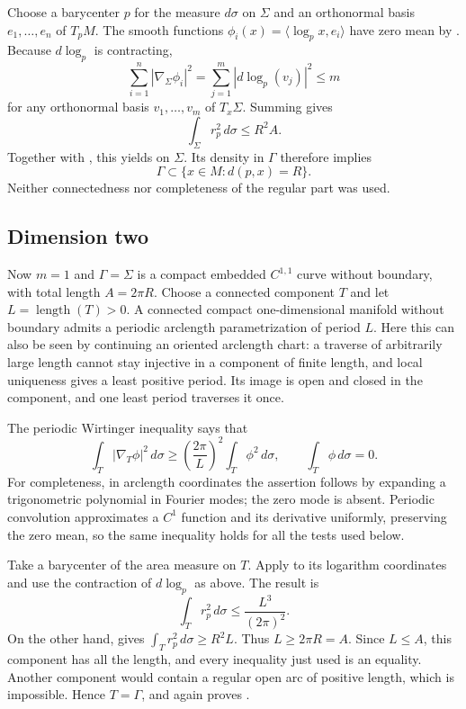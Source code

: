 Choose a barycenter $p$ for the measure $d\sigma$ on $\Sigma$ and an
orthonormal basis $e_1,\ldots,e_n$ of $T_pM$.
The smooth functions
$\phi_i(x)=\langle\log_p x,e_i\rangle$ have zero mean by
. Because $d\log_p$ is contracting,
\[
 \sum_{i=1}^n|\nabla_\Sigma\phi_i|^2
 =\sum_{j=1}^m|d\log_p(v_j)|^2\le m
\]
for any orthonormal basis $v_1,\ldots,v_m$ of $T_x\Sigma$.
Summing  gives
\begin{equation}\label{eq:upper-moment}
 \int_\Sigma r_p^2\,d\sigma\le R^2A.
\end{equation}
Together with , this yields
 on $\Sigma$. Its density in $\Gamma$ therefore
implies
\begin{equation}\label{eq:central-sphere}
 \Gamma\subset\{x\in M:d(p,x)=R\}.
\end{equation}
Neither connectedness nor completeness of the regular part was used.

\subsection{Dimension two}
Now $m=1$ and $\Gamma=\Sigma$ is a compact embedded $C^{1,1}$
curve without boundary, with total length $A=2\pi R$.
Choose a connected component $T$ and let $L=\operatorname{length}(T)>0$.
A connected compact one-dimensional manifold without boundary admits a
periodic arclength parametrization of period $L$. Here this can also be
seen by continuing an oriented arclength chart: a traverse of arbitrarily
large length cannot stay injective in a component of finite length, and
local uniqueness gives a least positive period. Its image is open and
closed in the component, and one least period traverses it once.

The periodic Wirtinger inequality says that
\begin{equation}\label{eq:wirtinger}
 \int_T |\nabla_T\phi|^2\,d\sigma
 \ge \left(\frac{2\pi}{L}\right)^2
       \int_T\phi^2\,d\sigma,
 \qquad \int_T\phi\,d\sigma=0.
\end{equation}
For completeness, in arclength coordinates the assertion follows by
expanding a trigonometric polynomial in Fourier modes; the zero mode is
absent. Periodic convolution approximates a $C^1$ function and its
derivative uniformly, preserving the zero mean, so the same inequality
holds for all the tests used below.

Take a barycenter of the area measure on $T$. Apply
 to its logarithm coordinates and use the contraction
of $d\log_p$ as above. The result is
\[
 \int_T r_p^2\,d\sigma\le \frac{L^3}{(2\pi)^2}.
\]
On the other hand,  gives
$\int_T r_p^2\,d\sigma\ge R^2L$. Thus $L\ge2\pi R=A$.
Since $L\le A$, this component has all the length, and every inequality
just used is an equality. Another component would contain a regular open
arc of positive length, which is impossible. Hence $T=\Gamma$, and
 again proves .

